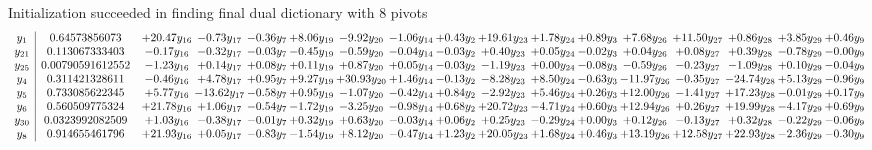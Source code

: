 \documentclass[9pt]{article}
\begin{document}
Initialization succeeded in finding final dual dictionary with 8 pivots
\[\begin{array}{c| c c@{\hskip 2pt} c@{\hskip 2pt} c@{\hskip 2pt} c@{\hskip 2pt} c@{\hskip 2pt} c@{\hskip 2pt} c@{\hskip 2pt} c@{\hskip 2pt} c@{\hskip 2pt} c@{\hskip 2pt} c@{\hskip 2pt} c@{\hskip 2pt} c@{\hskip 2pt} c@{\hskip 2pt} c@{\hskip 2pt} }
 y_{1}   &  0.64573856073 & + 20.47 y_{16} & -0.73 y_{17} & -0.36 y_{7} & +  8.06 y_{19} & -9.92 y_{20} & -1.06 y_{14} & +  0.43 y_{2} & + 19.61 y_{23} & +  1.78 y_{24} & +  0.89 y_{3} & +  7.68 y_{26} & + 11.50 y_{27} & +  0.86 y_{28} & +  3.85 y_{29} & +  0.46 y_{9}\\
 y_{21}   &  0.113067333403 & -0.17 y_{16} & -0.32 y_{17} & -0.03 y_{7} & -0.45 y_{19} & -0.59 y_{20} & -0.04 y_{14} & -0.03 y_{2} & +  0.40 y_{23} & +  0.05 y_{24} & -0.02 y_{3} & +  0.04 y_{26} & +  0.08 y_{27} & +  0.39 y_{28} & -0.78 y_{29} & -0.00 y_{9}\\
 y_{25}   &  0.00790591612552 & -1.23 y_{16} & +  0.14 y_{17} & +  0.08 y_{7} & +  0.11 y_{19} & +  0.87 y_{20} & +  0.05 y_{14} & -0.03 y_{2} & -1.19 y_{23} & +  0.00 y_{24} & -0.08 y_{3} & -0.59 y_{26} & -0.23 y_{27} & -1.09 y_{28} & +  0.10 y_{29} & -0.04 y_{9}\\
 y_{4}   &  0.311421328611 & -0.46 y_{16} & +  4.78 y_{17} & +  0.95 y_{7} & +  9.27 y_{19} & + 30.93 y_{20} & +  1.46 y_{14} & -0.13 y_{2} & -8.28 y_{23} & +  8.50 y_{24} & -0.63 y_{3} & -11.97 y_{26} & -0.35 y_{27} & -24.74 y_{28} & +  5.13 y_{29} & -0.96 y_{9}\\
 y_{5}   &  0.733085622345 & +  5.77 y_{16} & -13.62 y_{17} & -0.58 y_{7} & +  0.95 y_{19} & -1.07 y_{20} & -0.42 y_{14} & +  0.84 y_{2} & -2.92 y_{23} & +  5.46 y_{24} & +  0.26 y_{3} & + 12.00 y_{26} & -1.41 y_{27} & + 17.23 y_{28} & -0.01 y_{29} & +  0.17 y_{9}\\
 y_{6}   &  0.560509775324 & + 21.78 y_{16} & +  1.06 y_{17} & -0.54 y_{7} & -1.72 y_{19} & -3.25 y_{20} & -0.98 y_{14} & +  0.68 y_{2} & + 20.72 y_{23} & -4.71 y_{24} & +  0.60 y_{3} & + 12.94 y_{26} & +  0.26 y_{27} & + 19.99 y_{28} & -4.17 y_{29} & +  0.69 y_{9}\\
 y_{30}   &  0.0323992082509 & +  1.03 y_{16} & -0.38 y_{17} & -0.01 y_{7} & +  0.32 y_{19} & +  0.63 y_{20} & -0.03 y_{14} & +  0.06 y_{2} & +  0.25 y_{23} & -0.29 y_{24} & +  0.00 y_{3} & +  0.12 y_{26} & -0.13 y_{27} & +  0.32 y_{28} & -0.22 y_{29} & -0.06 y_{9}\\
 y_{8}   &  0.914655461796 & + 21.93 y_{16} & +  0.05 y_{17} & -0.83 y_{7} & -1.54 y_{19} & +  8.12 y_{20} & -0.47 y_{14} & +  1.23 y_{2} & + 20.05 y_{23} & +  1.68 y_{24} & +  0.46 y_{3} & + 13.19 y_{26} & + 12.58 y_{27} & + 22.93 y_{28} & -2.36 y_{29} & -0.30 y_{9}\\

\end{array}\]
\end{document}
